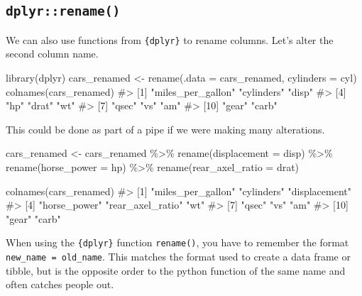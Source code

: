 \documentclass[
  letterpaper,
  DIV=11,
  numbers=noendperiod]{scrreprt}
\newenvironment{Shaded}{\begin{snugshade}}{\end{snugshade}}
\newcommand{\AttributeTok}[1]{\textcolor[rgb]{0.40,0.45,0.13}{#1}}
\newcommand{\CommentTok}[1]{\textcolor[rgb]{0.37,0.37,0.37}{#1}}
\newcommand{\FunctionTok}[1]{\textcolor[rgb]{0.28,0.35,0.67}{#1}}
\newcommand{\NormalTok}[1]{\textcolor[rgb]{0.00,0.23,0.31}{#1}}
\newcommand{\OtherTok}[1]{\textcolor[rgb]{0.00,0.23,0.31}{#1}}
\newcommand{\SpecialCharTok}[1]{\textcolor[rgb]{0.37,0.37,0.37}{#1}}
\begin{document}
\subsection{\texorpdfstring{\texttt{dplyr::rename()}}{dplyr::rename()}}\label{dplyrrename}

We can also use functions from \texttt{\{dplyr\}} to rename columns.
Let's alter the second column name.

\begin{Shaded}
\begin{Highlighting}[]
\FunctionTok{library}\NormalTok{(dplyr)}
\NormalTok{cars\_renamed }\OtherTok{\textless{}{-}} \FunctionTok{rename}\NormalTok{(}\AttributeTok{.data =}\NormalTok{ cars\_renamed, }\AttributeTok{cylinders =}\NormalTok{ cyl)}
\FunctionTok{colnames}\NormalTok{(cars\_renamed)}
\CommentTok{\#\textgreater{}  [1] "miles\_per\_gallon" "cylinders"        "disp"            }
\CommentTok{\#\textgreater{}  [4] "hp"               "drat"             "wt"              }
\CommentTok{\#\textgreater{}  [7] "qsec"             "vs"               "am"              }
\CommentTok{\#\textgreater{} [10] "gear"             "carb"}
\end{Highlighting}
\end{Shaded}

This could be done as part of a pipe if we were making many alterations.

\begin{Shaded}
\begin{Highlighting}[]
\NormalTok{cars\_renamed }\OtherTok{\textless{}{-}}\NormalTok{ cars\_renamed }\SpecialCharTok{\%\textgreater{}\%} 
  \FunctionTok{rename}\NormalTok{(}\AttributeTok{displacement =}\NormalTok{ disp) }\SpecialCharTok{\%\textgreater{}\%} 
  \FunctionTok{rename}\NormalTok{(}\AttributeTok{horse\_power =}\NormalTok{ hp) }\SpecialCharTok{\%\textgreater{}\%} 
  \FunctionTok{rename}\NormalTok{(}\AttributeTok{rear\_axel\_ratio =}\NormalTok{ drat)}

\FunctionTok{colnames}\NormalTok{(cars\_renamed)}
\CommentTok{\#\textgreater{}  [1] "miles\_per\_gallon" "cylinders"        "displacement"    }
\CommentTok{\#\textgreater{}  [4] "horse\_power"      "rear\_axel\_ratio"  "wt"              }
\CommentTok{\#\textgreater{}  [7] "qsec"             "vs"               "am"              }
\CommentTok{\#\textgreater{} [10] "gear"             "carb"}
\end{Highlighting}
\end{Shaded}

When using the \texttt{\{dplyr\}} function \texttt{rename()}, you have
to remember the format \texttt{new\_name\ =\ old\_name}. This matches
the format used to create a data frame or tibble, but is the opposite
order to the python function of the same name and often catches people
out.
\end{document}
